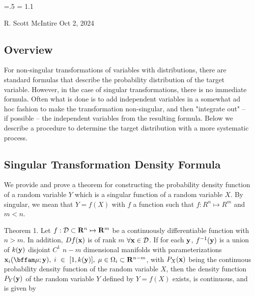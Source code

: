 

\parindent=0pt
\parskip=.5\baselineskip
\baselineskip = 1.1\baselineskip

\footline{\hss\tenrm\folio\hss}



{R. Scott McIntire} {Oct 2, 2024}

\subsection{Overview}
For non-singular transformations of variables with distributions, there 
are standard formulas that describe the probability distribution 
of the target variable. However, in the case of singular transformations,
there is no immediate formula. Often what is done is to add independent 
variables in a somewhat ad hoc fashion to make the transformation 
non-singular, and then "integrate out" -- if possible -- 
the independent variables from the resulting formula. 
Below we describe a procedure to determine the
target distribution with a more systematic process.

\subsection{Singular Transformation Density Formula}
We provide and prove a theorem for constructing the probability 
density function of a random variable $Y$ which is a singular function of a 
random variable $X$. By singular, we mean that $Y = f(X)$ with $f$ a function
such that $f: R^n \mapsto R^m$ and $m < n$. 

\proclaim Theorem 1. Let $f : {\cal D} \subset {\bf R}^n \mapsto {\bf R}^m$ be a continuously
          differentiable function with $n > m$. In addition,
          $Df({\bf x})$ is of rank $m$ $\forall {\bf x} \in {\cal D}$.
          If for each
          ${\bf y}$, $f^{-1}({\bf y})$ is a union of $k({\bf y})$ 
          disjoint $C^1$ $n-m$ dimensional manifolds with
          parameterizations ${\bf x}_i({\bffam \mu} ; {\bf y}), \;
          i~\in~[1,k({\bf y})], \; \mu \in \Omega_i \subset {\bf R}^{n-m}$,
          with $P_X({\bf x})$ being the continuous probability
          density function of the random variable $X$, then the 
          density function $P_Y({\bf y})$ of the random variable $Y$ 
          defined by $Y = f(X)$ exists, is continuous, and is given by

